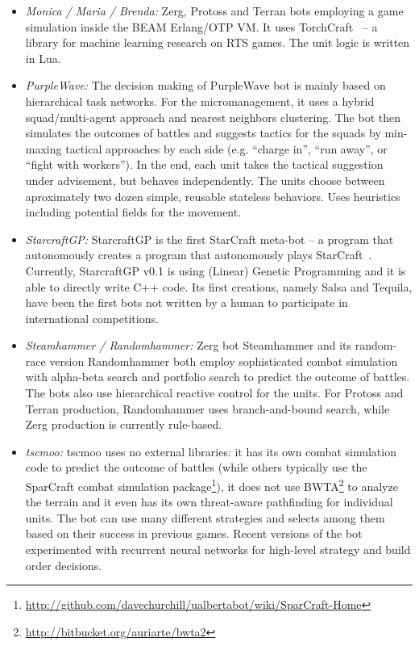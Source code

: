 \begin{itemize}
  \item {\em  Monica / Maria / Brenda:} Zerg, Protoss and Terran bots employing a game simulation inside the BEAM Erlang/OTP VM. It uses TorchCraft~\cite{synnaeve2016torchcraft}  -- a library for machine learning research on RTS games. The unit logic is written in Lua.
  
  \item {\em PurpleWave:} The decision making of PurpleWave bot is mainly based on hierarchical task networks. For the micromanagement, it uses a hybrid squad/multi-agent approach and nearest neighbors clustering. The bot then simulates the outcomes of battles and suggests tactics for the squads by min-maxing tactical approaches by each side (e.g. ``charge in'', ``run away'', or ``fight with workers''). In the end, each unit takes the tactical suggestion under advisement, but behaves independently. The units choose between aproximately two dozen simple, reusable stateless behaviors. Uses heuristics including potential fields for the movement.
  
  \item {\em StarcraftGP:} StarcraftGP is the first StarCraft meta-bot -- a program that autonomously creates a program that autonomously plays StarCraft~\cite{garcia2015towards}. Currently, StarcraftGP v0.1 is using (Linear) Genetic Programming and it is able to directly write C++ code. Its first creations, namely Salsa and Tequila, have been the first bots not written by a human to participate in international competitions.

  \item {\em Steamhammer / Randomhammer:} Zerg bot Steamhammer and its random-race version Randomhammer both employ sophisticated combat simulation with alpha-beta search and portfolio search to predict the outcome of battles. The bots also use hierarchical reactive control for the units. For Protoss and Terran production, Randomhammer uses branch-and-bound search, while Zerg production is currently rule-based.

  \item {\em tscmoo:} tscmoo uses no external libraries: it has its own combat simulation code to predict the outcome of battles (while others typically use the SparCraft combat simulation package\footnote{\url{http://github.com/davechurchill/ualbertabot/wiki/SparCraft-Home}}), it does not use BWTA\footnote{\url{http://bitbucket.org/auriarte/bwta2}} to analyze the terrain and it even has its own threat-aware pathfinding for individual units. The bot can use many different strategies and selects among them based on their success in previous games. Recent versions of the bot experimented with recurrent neural networks for high-level strategy and build order decisions.
  

\end{itemize}
